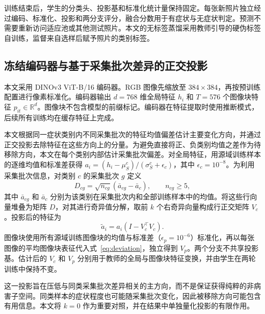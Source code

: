 \documentclass[11pt,a4paper,UTF8,fontset=windows,scheme=plain]{ctexart}
\begin{document}
训练结束后，学生的分类头、投影基和标准化统计量保持固定。每张新照片独立经过编码、标准化、投影和两分支评分，融合分数用于有症状与无症状判定。预测不需要重新访问适应池或其他测试照片。本文的无标签蒸馏采用教师引导的硬伪标签自训练，监督来自选样后赋予照片的类别标签。

\subsection{冻结编码器与基于采集批次差异的正交投影}
本文采用 DINOv3 ViT-B/16 编码器\cite{simeoni2026}。RGB 图像先缩放至 $384\times384$，再按预训练配置进行像素标准化。编码器输出 $d=768$ 维全局特征 $h_i$ 和 $T=576$ 个图像块特征 $p_{it}\in\mathbb R^d$。图像块不包含模型的前缀标记。编码器在特征提取时使用推断模式，后续所有训练均在缓存特征上完成。

本文根据同一症状类别内不同采集批次的特征均值偏差估计主要变化方向，并通过正交投影去除特征在这些方向上的分量。为避免直接将正、负类别均值之差作为待移除方向，本文在每个类别内部估计采集批次偏差。对全局特征，用源域训练样本的逐维均值和标准差获得 $a_i=(h_i-\mu_S^c)/(\sigma_S^c+\epsilon_c)$，其中 $\epsilon_c=10^{-8}$。为利用采集批次信息，对类别 $c$ 的采集批次 $g$ 定义
\begin{equation}
D_{cg}=\sqrt{n_{cg}}\left(\bar a_{cg}-\bar a_c\right),\qquad n_{cg}\geq5,
\label{eq:deviation}
\end{equation}
其中 $\bar a_{cg}$ 和 $\bar a_c$ 分别为该类别在采集批次内和全部训练样本中的均值。将这些行向量堆叠为矩阵 $D$，对其进行奇异值分解，取前 $k$ 个右奇异向量构成行正交矩阵 $V_c$。投影后的特征为
\begin{equation}
\widetilde a_i=a_i(I-V_c^\top V_c).
\label{eq:projection}
\end{equation}
图像块使用所有源域训练图像块的均值与标准差（$\epsilon_p=10^{-6}$）标准化，再以每张图像的平均图像块表征代入式~\eqref{eq:deviation}，独立得到 $V_p$。两个分支不共享投影基。估计后的 $V_c$ 和 $V_p$ 分别用于教师的全局与图像块特征变换，并由学生在两轮训练中保持不变。

这一投影旨在压低与同类采集批次差异相关的主方向，而不是保证获得纯粹的非病害子空间。同类样本的症状程度也可能随采集批次变化，因此被移除方向可能包含有用信息。本文将 $k=0$ 作为重要对照，并在结果中单独量化投影的有限作用。
\end{document}

